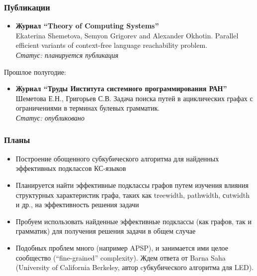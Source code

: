 \documentclass{beamer}
\begin{document}
\begin{frame}
\frametitle{Публикации}
\begin{itemize}
\item \textbf{Журнал ``Theory of Computing Systems''} \\
Ekaterina Shemetova, Semyon Grigorev and Alexander Okhotin. Parallel efficient variants of context-free language reachability problem.
\\\textit{Статус: планируется публикация}
\end{itemize}
Прошлое полугодие: 
\begin{itemize}
\item  \textbf{Журнал ``Труды Института системного программирования РАН''}
\\Шеметова Е.Н., Григорьев С.В. Задача поиска путей в ациклических графах с ограничениями в терминах булевых грамматик. 
\\\textit{Статус: опубликовано}
\end{itemize}

\end{frame}
\begin{frame}
\frametitle{Планы}
\begin{itemize}
\item Построение обощенного субкубического алгоритма для найденных эффективных подклассов КС-языков
\item Планируется найти эффективные подклассы графов путем изучения влияния структурных характеристик графа, таких как treewidth, pathwidth, сutwidth и др., на эффективность решения задачи
\item Пробуем использовать найденные эффективные подклассы (как графов, так и грамматик) для получения решения задачи в общем случае 
\item Подобных проблем много (например APSP), и занимается ими целое сообщество (``fine-grained'' complexity). Ждем ответа от Barna Saha (University of California Berkeley, автор cубкубического алгоритма для LED).
\end{itemize}

\end{frame}
\end{document}
